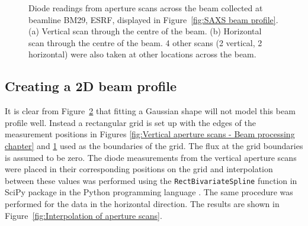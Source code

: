 \begin{figure}
\begin{subfigure}[b]{0.9\textwidth}
            \caption{}
            \label{fig:Horizontal aperture scans - Beam processing chapter}
    \end{subfigure}
    \caption[Diode readings from aperture scans across the beam collected at beamline BM29, ESRF.]{Diode readings from aperture scans across the beam collected at beamline BM29, ESRF, displayed in Figure~\ref{fig:SAXS beam profile}. (a) Vertical scan through the centre of the beam. (b) Horizontal scan through the centre of the beam. 4 other scans (2 vertical, 2 horizontal) were also taken at other locations across the beam.}
    \label{fig:Aperture scans - Beam processing chapter}
\end{figure}

\subsection{Creating a 2D beam profile}
\label{sub:Creating a 2D beam profile}
It is clear from Figure~\ref{fig:Aperture scans - Beam processing chapter} that fitting a Gaussian shape will not model this beam profile well.
Instead a rectangular grid is set up with the edges of the measurement positions in Figures \ref{fig:Vertical aperture scans - Beam processing chapter} and \ref{fig:Horizontal aperture scans - Beam processing chapter} used as the boundaries of the grid.
The flux at the grid boundaries is assumed to be zero.
The diode measurements from the vertical aperture scans were placed in their corresponding positions on the grid and interpolation between these values was performed using the \verb+RectBivariateSpline+ function in SciPy package in the Python programming language \cite{jones2014scipy}.
The same procedure was performed for the data in the horizontal direction.
The results are shown in Figure~\ref{fig:Interpolation of aperture scans}.
